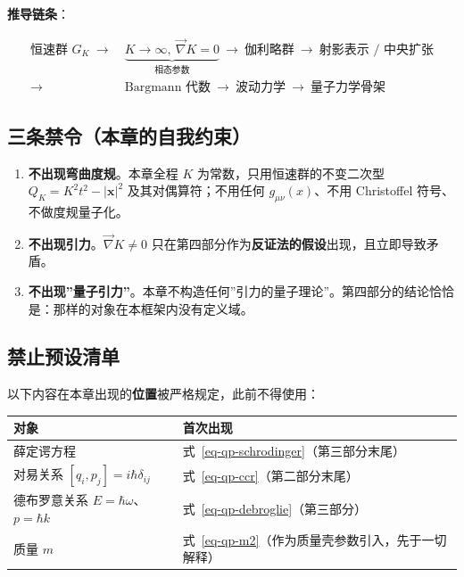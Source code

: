 \documentclass[
  chinese,
  a4paper,
  UTF8,
  12pt,
  oneside,
  openany]{ctexbook}
\newcounter{none} %
\providecommand{\tightlist}{%
  \setlength{\itemsep}{0pt}\setlength{\parskip}{0pt}}
\theoremstyle{plain}
\theoremstyle{plain}
\theoremstyle{plain}
\theoremstyle{definition}
\theoremstyle{plain}
\theoremstyle{plain}
\theoremstyle{remark}
\begin{document}
\textbf{推导链条}：

\[
\begin{aligned}
\text{恒速群 } G_K\ \longrightarrow\ &\underbrace{K\to\infty,\ \vec\nabla K=0}_{\text{相态参数}}
\ \longrightarrow\ \text{伽利略群}\ \longrightarrow\ \text{射影表示 / 中央扩张}\\[4pt]
\longrightarrow\ &\text{Bargmann 代数}\ \longrightarrow\ \text{波动力学}\ \longrightarrow\ \text{量子力学骨架}
\end{aligned}
\]

\subsection{三条禁令（本章的自我约束）}\label{ux4e09ux6761ux7981ux4ee4ux672cux7ae0ux7684ux81eaux6211ux7ea6ux675f}

\begin{enumerate}
\def\labelenumi{\arabic{enumi}.}
\tightlist
\item
  \textbf{不出现弯曲度规}。本章全程 \(K\) 为常数，只用恒速群的不变二次型
  \(Q_K=K^{2}t^{2}-\lvert\mathbf{x}\rvert^{2}\) 及其对偶算符；不用任何
  \(g_{\mu\nu}(x)\)、不用 Christoffel 符号、不做度规量子化。
\item
  \textbf{不出现引力}。\(\vec\nabla K\neq0\)
  只在第四部分作为\textbf{反证法的假设}出现，且立即导致矛盾。
\item
  \textbf{不出现''量子引力''}。本章不构造任何''引力的量子理论''。第四部分的结论恰恰是：那样的对象在本框架内没有定义域。
\end{enumerate}

\subsection{禁止预设清单}\label{ux7981ux6b62ux9884ux8bbeux6e05ux5355}

以下内容在本章出现的\textbf{位置}被严格规定，此前不得使用：

{\def\LTcaptype{none} %
\begin{longtable}[]{@{}
  >{\raggedright\arraybackslash}p{}
  >{\raggedright\arraybackslash}p{}@{}}
\toprule\noalign{}
\begin{minipage}[b]{\linewidth}\raggedright
对象
\end{minipage} & \begin{minipage}[b]{\linewidth}\raggedright
首次出现
\end{minipage} \\
\midrule\noalign{}
\endhead
\bottomrule\noalign{}
\endlastfoot
薛定谔方程 & 式~\ref{eq-qp-schrodinger}（第三部分末尾） \\
对易关系 \([q_i,p_j]=i\hbar\delta_{ij}\) &
式~\ref{eq-qp-ccr}（第二部分末尾） \\
德布罗意关系 \(E=\hbar\omega\)、\(p=\hbar k\) &
式~\ref{eq-qp-debroglie}（第三部分） \\
质量 \(m\) & 式~\ref{eq-qp-m2}（作为质量壳参数引入，先于一切解释） \\
\end{longtable}
}
\end{document}

